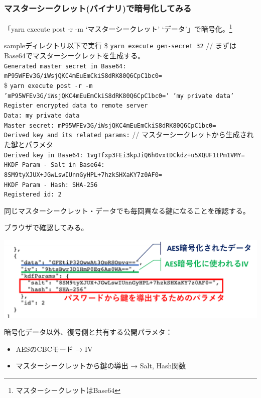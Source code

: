 \documentclass[12pt,dvipdfmx]{beamer}
\begin{document}
\begin{frame}
\frametitle{マスターシークレット(バイナリ)で暗号化してみる}
\small
「yarn execute post -r -m `マスターシークレット' `データ'」で暗号化。\footnote[frame]{マスターシークレットはBase64}

\begin{block}{\small sampleディレクトリ以下で実行}
\scriptsize
\$ \texttt{yarn execute gen-secret 32} // まずはBase64でマスターシークレットを生成する。\\
\texttt{Generated master secret in Base64: \alert{mP95WFEv3G/iWsjQKC4mEuEmCkiS8dRK80Q6CpC1bc0=}}\\[2ex]
\$ \texttt{yarn execute post -r -m 'mP95WFEv3G/iWsjQKC4mEuEmCkiS8dRK80Q6CpC1bc0=' 'my private data'}\\
\texttt{Register encrypted data to remote server}\\
\texttt{Data: my private data}\\
\texttt{Master secret: mP95WFEv3G/iWsjQKC4mEuEmCkiS8dRK80Q6CpC1bc0=}\\
{\color{red}
\texttt{Derived key and its related params:} // マスターシークレットから生成された鍵とパラメタ\\
\texttt{\quad Derived key in Base64: 1vgTfxp3FEi3kpJiQ6h0vxtDCkdz+u5XQUF1tPm1VMY=}\\
\texttt{\quad HKDF Param - Salt in Base64: 8SM9tyXJUX+JGwLswIUnnGyHPL+7hzkSHXaKY7z0AF0=}\\
\texttt{\quad HKDF Param - Hash: SHA-256}
}\\
\texttt{Registered id: 2}
\end{block}

同じマスターシークレット・データでも毎回異なる鍵になることを確認する。

\end{frame}


\begin{frame}
ブラウザで確認してみる。

\begin{center}
\includegraphics[width=\linewidth]{FigsSample02/data_hkdf.pdf}
\end{center} 

暗号化データ以外、復号側と共有する公開パラメタ：
\begin{itemize}
 \item AESのCBCモード → IV
 \item マスターシークレットから鍵の導出 → Salt, Hash関数
\end{itemize}
\end{frame}
\end{document}
